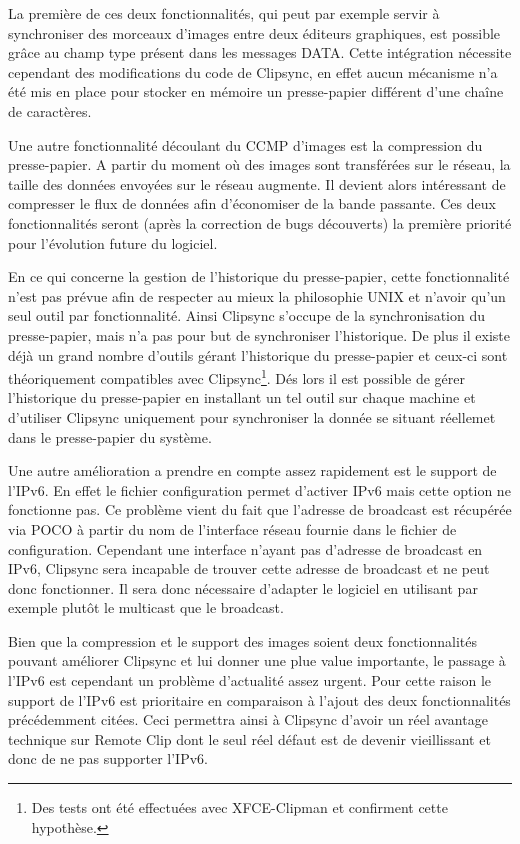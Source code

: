 La première de ces deux fonctionnalités, qui peut par exemple servir à
synchroniser des morceaux d'images entre deux éditeurs graphiques, est
possible grâce au champ type présent dans les messages DATA. Cette intégration
nécessite cependant des modifications du code de Clipsync, en effet aucun
mécanisme n'a été mis en place pour stocker en mémoire un presse-papier
différent d'une chaîne de caractères.

Une autre fonctionnalité découlant du CCMP d'images est la compression du
presse-papier. A partir du moment où des images sont transférées sur le
réseau, la taille des données envoyées sur le réseau augmente. Il devient
alors intéressant de compresser le flux de données afin d'économiser de la
bande passante. Ces deux fonctionnalités seront (après la correction
de bugs découverts) la première priorité pour l'évolution future du logiciel.

En ce qui concerne la gestion de l'historique du presse-papier, cette
fonctionnalité n'est pas prévue afin de respecter au mieux la philosophie
UNIX et n'avoir qu'un seul outil par fonctionnalité. Ainsi Clipsync
s'occupe de la synchronisation du presse-papier, mais n'a pas pour but de
synchroniser l'historique. De plus il existe déjà un grand nombre d'outils
gérant l'historique du presse-papier et ceux-ci sont théoriquement compatibles
avec Clipsync\footnote{Des tests ont été effectuées avec XFCE-Clipman et
confirment cette hypothèse.}. Dés lors il est possible de gérer l'historique
du presse-papier en installant un tel outil sur chaque machine et d'utiliser
Clipsync uniquement pour synchroniser la donnée se situant réellemet dans
le presse-papier du système.

Une autre amélioration a prendre en compte assez rapidement est le support
de l'IPv6. En effet le fichier configuration permet d'activer IPv6 mais
cette option ne fonctionne pas. Ce problème vient du fait que l'adresse
de broadcast est récupérée via POCO à partir du nom de l'interface réseau
fournie dans le fichier de configuration. Cependant une interface n'ayant
pas d'adresse de broadcast en IPv6, Clipsync sera incapable de trouver
cette adresse de broadcast et ne peut donc fonctionner. Il sera donc nécessaire
d'adapter le logiciel en utilisant par exemple plutôt le multicast que le
broadcast.

Bien que la compression et le support des images soient deux fonctionnalités
pouvant améliorer Clipsync et lui donner une plue value importante, le passage
à l'IPv6 est cependant un problème d'actualité assez urgent. Pour cette
raison le support de l'IPv6 est prioritaire en comparaison à l'ajout des
deux fonctionnalités précédemment citées. Ceci permettra ainsi à Clipsync
d'avoir un réel avantage technique sur Remote Clip dont le seul réel défaut
est de devenir vieillissant et donc de ne pas supporter l'IPv6.

